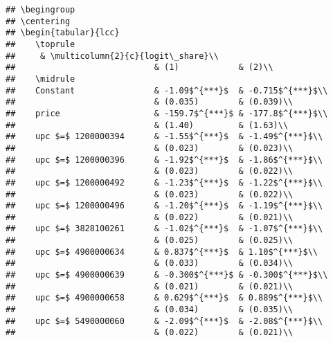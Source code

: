 \documentclass[
]{article}
\begin{document}
\begin{verbatim}
## \begingroup
## \centering
## \begin{tabular}{lcc}
##    \toprule
##     & \multicolumn{2}{c}{logit\_share}\\
##                            & (1)            & (2)\\  
##    \midrule 
##    Constant                & -1.09$^{***}$  & -0.715$^{***}$\\   
##                            & (0.035)        & (0.039)\\   
##    price                   & -159.7$^{***}$ & -177.8$^{***}$\\   
##                            & (1.40)         & (1.63)\\   
##    upc $=$ 1200000394      & -1.55$^{***}$  & -1.49$^{***}$\\   
##                            & (0.023)        & (0.023)\\   
##    upc $=$ 1200000396      & -1.92$^{***}$  & -1.86$^{***}$\\   
##                            & (0.023)        & (0.022)\\   
##    upc $=$ 1200000492      & -1.23$^{***}$  & -1.22$^{***}$\\   
##                            & (0.023)        & (0.022)\\   
##    upc $=$ 1200000496      & -1.20$^{***}$  & -1.19$^{***}$\\   
##                            & (0.022)        & (0.021)\\   
##    upc $=$ 3828100261      & -1.02$^{***}$  & -1.07$^{***}$\\   
##                            & (0.025)        & (0.025)\\   
##    upc $=$ 4900000634      & 0.837$^{***}$  & 1.10$^{***}$\\   
##                            & (0.033)        & (0.034)\\   
##    upc $=$ 4900000639      & -0.300$^{***}$ & -0.300$^{***}$\\   
##                            & (0.021)        & (0.021)\\   
##    upc $=$ 4900000658      & 0.629$^{***}$  & 0.889$^{***}$\\   
##                            & (0.034)        & (0.035)\\   
##    upc $=$ 5490000060      & -2.09$^{***}$  & -2.08$^{***}$\\   
##                            & (0.022)        & (0.021)\\   

\end{verbatim}
\end{document}

